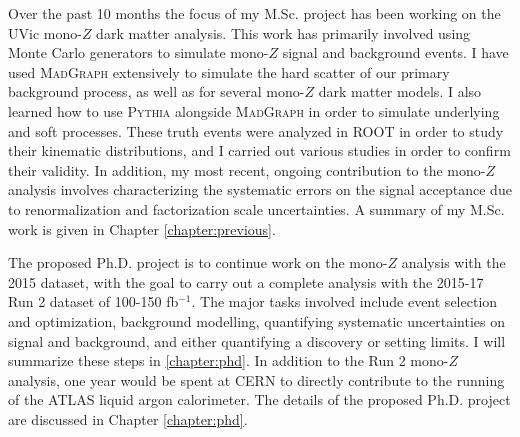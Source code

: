 \label{chapter:introduction}

Over the past 10 months the focus of my M.Sc. project has been working on the UVic mono-$Z$ dark matter analysis. This work has primarily involved using Monte Carlo generators to simulate mono-$Z$ signal and background events. I have used \textsc{MadGraph} extensively to simulate the hard scatter of our primary background process, as well as for several mono-$Z$ dark matter models. I also learned how to use \textsc{Pythia} alongside \textsc{MadGraph} in order to simulate underlying and soft processes. These truth events were analyzed in ROOT in order to study their kinematic distributions, and I carried out various studies in order to confirm their validity. In addition, my most recent, ongoing contribution to the mono-$Z$ analysis involves characterizing the systematic errors on the signal acceptance due to renormalization and factorization scale uncertainties. A summary of my M.Sc. work is given in Chapter \ref{chapter:previous}. 

The proposed Ph.D. project is to continue work on the mono-$Z$ analysis with the 2015 dataset, with the goal to carry out a complete analysis with the 2015-17 Run 2 dataset of 100-150 fb$^{-1}$. The major tasks involved include event selection and optimization, background modelling, quantifying systematic uncertainties on signal and background, and either quantifying a discovery or setting limits. I will summarize these steps in \ref{chapter:phd}. In addition to the Run 2 mono-$Z$ analysis, one year would be spent at CERN to directly contribute to the running of the ATLAS liquid argon calorimeter. The details of the proposed Ph.D. project are discussed in Chapter \ref{chapter:phd}.